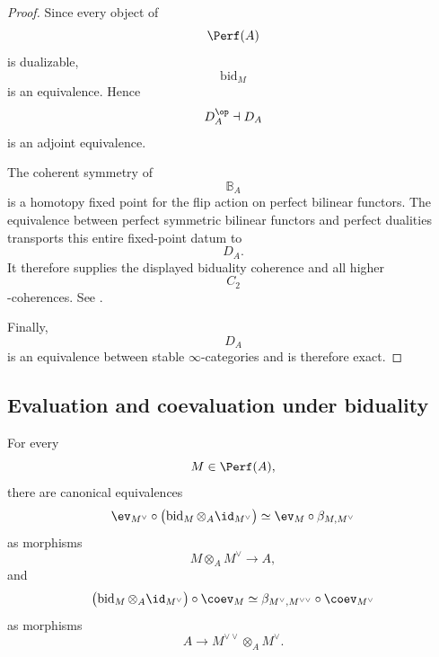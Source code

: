 \begin{proof}
Since every object of
\[
    \Perf(A)
\]
is dualizable,
\[
    \operatorname{bid}_M
\]
is an equivalence. Hence
\[
    D_A^{\op}
    \dashv
    D_A
\]
is an adjoint equivalence.

The coherent symmetry of
\[
    \mathbb B_A
\]
is a homotopy fixed point for the flip action on perfect bilinear
functors. The equivalence between perfect symmetric bilinear functors and
perfect dualities transports this entire fixed-point datum to
\[
    D_A.
\]
It therefore supplies the displayed biduality coherence and all higher
\[
    C_2
\]
-coherences. See
\cite{CalmesDottoHarpazEtAl}.

Finally,
\[
    D_A
\]
is an equivalence between stable $\infty$-categories and is therefore
exact.
\end{proof}


\subsection{Evaluation and coevaluation under biduality}

\begin{lemma}
\label{lem:biduality-evaluation-coevaluation}
For every
\[
    M\in\Perf(A),
\]
there are canonical equivalences
\[
    \ev_{M^\vee}
    \circ
    \bigl(
        \operatorname{bid}_M
        \otimes_A
        \id_{M^\vee}
    \bigr)
    \simeq
    \ev_M
    \circ
    \beta_{M,M^\vee}
\]
as morphisms
\[
    M\otimes_A M^\vee
    \longrightarrow
    A,
\]
and
\[
    \bigl(
        \operatorname{bid}_M
        \otimes_A
        \id_{M^\vee}
    \bigr)
    \circ
    \coev_M
    \simeq
    \beta_{M^\vee,M^{\vee\vee}}
    \circ
    \coev_{M^\vee}
\]
as morphisms
\[
    A
    \longrightarrow
    M^{\vee\vee}\otimes_A M^\vee.
\]
\end{lemma}

